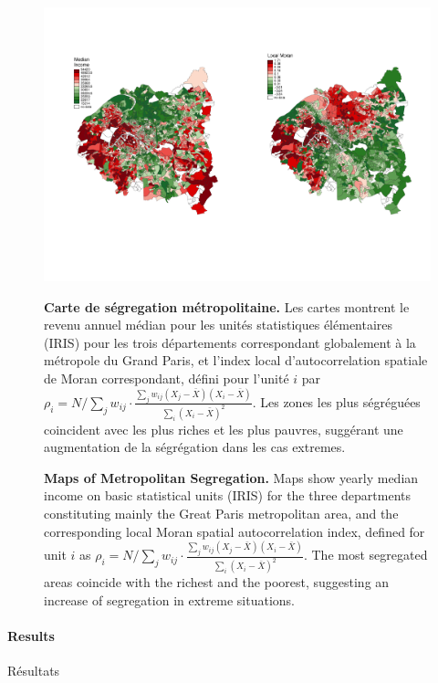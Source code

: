 \begin{figure}[h!]
\centering
\hspace{-3cm}\includegraphics[width=1.2\textwidth]{Figures/RobustnessDiscrepancy/grandParis_income_moran.pdf}\hspace{-2cm}
\vspace{-2.5cm}
\caption{\textbf{Maps of Metropolitan Segregation.} Maps show yearly median income on basic statistical units (IRIS) for the three departments constituting mainly the Great Paris metropolitan area, and the corresponding local Moran spatial autocorrelation index, defined for unit $i$ as $\rho_i = N/\sum_{j}w_{ij} \cdot \frac{\sum_{j} w_{ij} (X_j - \bar{X})(X_i - \bar{X})}{\sum_i (X_i - \bar{X})^2}$. The most segregated areas coincide with the richest and the poorest, suggesting an increase of segregation in extreme situations.}{\textbf{Carte de ségregation métropolitaine.} Les cartes montrent le revenu annuel médian pour les unités statistiques élémentaires (IRIS) pour les trois départements correspondant globalement à la métropole du Grand Paris, et l'index local d'autocorrelation spatiale de Moran correspondant, défini pour l'unité $i$ par $\rho_i = N/\sum_{j}w_{ij} \cdot \frac{\sum_{j} w_{ij} (X_j - \bar{X})(X_i - \bar{X})}{\sum_i (X_i - \bar{X})^2}$. Les zones les plus ségréguées coincident avec les plus riches et les plus pauvres, suggérant une augmentation de la ségrégation dans les cas extremes.}
\end{figure}

\paragraph{Results}{Résultats}


